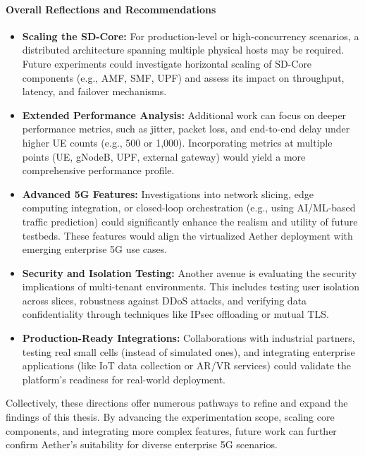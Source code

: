 \paragraph{Overall Reflections and Recommendations}
\begin{itemize}
    \item \textbf{Scaling the SD-Core:} 
    For production-level or high-concurrency scenarios, a distributed architecture 
    spanning multiple physical hosts may be required. Future experiments could 
    investigate horizontal scaling of SD-Core components (e.g., AMF, SMF, UPF) 
    and assess its impact on throughput, latency, and failover mechanisms.

    \item \textbf{Extended Performance Analysis:}
    Additional work can focus on deeper performance metrics, such as jitter, packet 
    loss, and end-to-end delay under higher UE counts (e.g., 500 or 1,000). 
    Incorporating metrics at multiple points (UE, gNodeB, UPF, external gateway) 
    would yield a more comprehensive performance profile.

    \item \textbf{Advanced 5G Features:}
    Investigations into network slicing, edge computing integration, or closed-loop 
    orchestration (e.g., using AI/ML-based traffic prediction) could significantly 
    enhance the realism and utility of future testbeds. These features would align the 
    virtualized Aether deployment with emerging enterprise 5G use cases.

    \item \textbf{Security and Isolation Testing:}
    Another avenue is evaluating the security implications of multi-tenant 
    environments. This includes testing user isolation across slices, robustness against 
    DDoS attacks, and verifying data confidentiality through techniques like IPsec 
    offloading or mutual TLS.

    \item \textbf{Production-Ready Integrations:}
    Collaborations with industrial partners, testing real small cells (instead of 
    simulated ones), and integrating enterprise applications (like IoT data 
    collection or AR/VR services) could validate the platform’s readiness for 
    real-world deployment.

\end{itemize}

Collectively, these directions offer numerous pathways to refine and expand the findings 
of this thesis. By advancing the experimentation scope, scaling core components, and 
integrating more complex features, future work can further confirm Aether’s suitability 
for diverse enterprise 5G scenarios.
